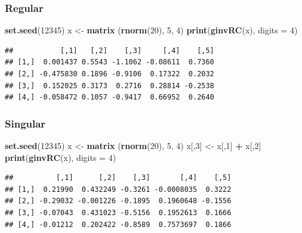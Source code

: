 \documentclass[12pt,]{article}
\newenvironment{Shaded}{\begin{snugshade}}{\end{snugshade}}
\newcommand{\KeywordTok}[1]{\textcolor[rgb]{0.13,0.29,0.53}{\textbf{#1}}}
\newcommand{\DataTypeTok}[1]{\textcolor[rgb]{0.13,0.29,0.53}{#1}}
\newcommand{\DecValTok}[1]{\textcolor[rgb]{0.00,0.00,0.81}{#1}}
\newcommand{\StringTok}[1]{\textcolor[rgb]{0.31,0.60,0.02}{#1}}
\newcommand{\OperatorTok}[1]{\textcolor[rgb]{0.81,0.36,0.00}{\textbf{#1}}}
\newcommand{\NormalTok}[1]{#1}
\begin{document}
\subsubsection{Regular}\label{regular-3}

\begin{Shaded}
\begin{Highlighting}[]
\KeywordTok{set.seed}\NormalTok{(}\DecValTok{12345}\NormalTok{)}
\NormalTok{x <-}\StringTok{ }\KeywordTok{matrix}\NormalTok{ (}\KeywordTok{rnorm}\NormalTok{(}\DecValTok{20}\NormalTok{), }\DecValTok{5}\NormalTok{, }\DecValTok{4}\NormalTok{)}
\KeywordTok{print}\NormalTok{(}\KeywordTok{ginvRC}\NormalTok{(x), }\DataTypeTok{digits =} \DecValTok{4}\NormalTok{)}
\end{Highlighting}
\end{Shaded}

\begin{verbatim}
##           [,1]   [,2]    [,3]     [,4]    [,5]
## [1,]  0.001437 0.5543 -1.1062 -0.08611  0.7360
## [2,] -0.475830 0.1896 -0.9106  0.17322  0.2032
## [3,]  0.152025 0.3173  0.2716  0.28814 -0.2538
## [4,] -0.058472 0.1057 -0.9417  0.66952  0.2640
\end{verbatim}

\subsubsection{Singular}\label{singular-3}

\begin{Shaded}
\begin{Highlighting}[]
\KeywordTok{set.seed}\NormalTok{(}\DecValTok{12345}\NormalTok{)}
\NormalTok{x <-}\StringTok{ }\KeywordTok{matrix}\NormalTok{ (}\KeywordTok{rnorm}\NormalTok{(}\DecValTok{20}\NormalTok{), }\DecValTok{5}\NormalTok{, }\DecValTok{4}\NormalTok{)}
\NormalTok{x[,}\DecValTok{3}\NormalTok{] <-}\StringTok{ }\NormalTok{x[,}\DecValTok{1}\NormalTok{] }\OperatorTok{+}\StringTok{ }\NormalTok{x[,}\DecValTok{2}\NormalTok{]}
\KeywordTok{print}\NormalTok{(}\KeywordTok{ginvRC}\NormalTok{(x), }\DataTypeTok{digits =} \DecValTok{4}\NormalTok{)}
\end{Highlighting}
\end{Shaded}

\begin{verbatim}
##          [,1]      [,2]    [,3]       [,4]    [,5]
## [1,]  0.21990  0.432249 -0.3261 -0.0008035  0.3222
## [2,] -0.29032 -0.001226 -0.1895  0.1960648 -0.1556
## [3,] -0.07043  0.431023 -0.5156  0.1952613  0.1666
## [4,] -0.01212  0.202422 -0.8589  0.7573697  0.1866
\end{verbatim}
\end{document}

